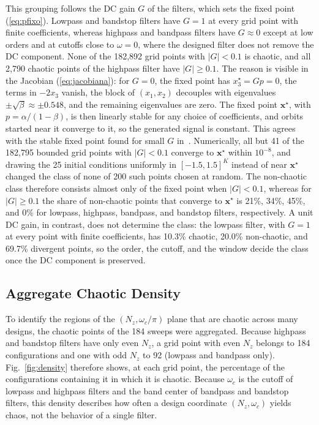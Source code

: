 \documentclass[journal]{IEEEtran}
\begin{document}
This grouping follows the DC gain $G$ of the filters, which sets the fixed point
(\ref{eq:pfixo}). Lowpass and bandstop filters have $G=1$ at every grid point with finite
coefficients,
whereas highpass and bandpass filters have $G\approx0$ except at low orders and
at cutoffs close to $\omega=0$, where the designed filter does not remove the DC
component. None of the 182,892 grid points with $|G|<0.1$ is chaotic, and all
2,790 chaotic points of the highpass filter have $|G|\ge0.1$. The reason is
visible in the Jacobian (\ref{eq:jacobiana}): for $G=0$, the fixed point has
$x_3^\star=Gp=0$, the terms in $-2x_3$ vanish, the block of $(x_1,x_2)$
decouples with eigenvalues $\pm\sqrt{\beta}\approx\pm0.548$, and the remaining
eigenvalues are zero. The fixed point $\mathbf{x}^\star$, with
$p=\alpha/(1-\beta)$, is then linearly stable for any choice of coefficients,
and orbits started near it converge to it, so the generated signal is constant.
This agrees with the stable fixed point found for small $G$ in~\cite{BorgesCNSNS2024}.
Numerically, all but 41 of the 182{,}795 bounded grid points with $|G|<0.1$
converge to $\mathbf{x}^\star$ within $10^{-8}$, and drawing the 25 initial
conditions uniformly in $[-1.5,1.5]^K$ instead of near $\mathbf{x}^\star$
changed the class of none of 200 such points chosen at random. The non-chaotic
class therefore consists almost only of the fixed point when $|G|<0.1$, whereas
for $|G|\ge0.1$ the share of non-chaotic points that converge to
$\mathbf{x}^\star$ is 21\%, 34\%, 45\%, and 0\%
for lowpass, highpass, bandpass, and bandstop filters, respectively. A unit DC
gain, in contrast, does not determine the class: the lowpass filter, with $G=1$
at every point with finite coefficients, has 10.3\% chaotic, 20.0\%
non-chaotic, and 69.7\% divergent points, so the order, the cutoff, and the
window decide the class once the DC component is preserved.

\subsection{Aggregate Chaotic Density}\label{sub:density}
To identify the regions of the $(N_z,\omega_c/\pi)$ plane that are chaotic
across many designs, the chaotic points of the 184 sweeps were aggregated.
Because highpass and bandstop filters have only even $N_z$, a grid point with
even $N_z$ belongs to 184 configurations and one with odd $N_z$ to 92 (lowpass
and bandpass only). Fig.~\ref{fig:density} therefore shows, at each grid point,
the percentage of the configurations containing it in which it is chaotic.
Because $\omega_c$ is the cutoff of lowpass and highpass filters and the band
center of bandpass and bandstop filters, this density describes how often a
design coordinate $(N_z,\omega_c)$ yields chaos, not the behavior of a single
filter.
\end{document}

